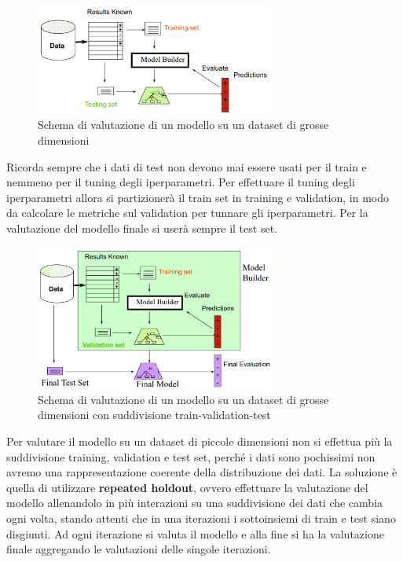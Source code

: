 \begin{figure}[!ht]
    \centering
    \includegraphics[width=0.7\textwidth]{img/performance evaluation/eval-big-dataset.png}
    \caption{Schema di valutazione di un modello su un dataset di grosse dimensioni}
    \label{fig:eval-big-dataset}
\end{figure}

Ricorda sempre che i dati di test non devono mai essere usati per il train e nemmeno
per il tuning degli iperparametri. Per effettuare il tuning degli iperparametri allora
si partizionerà il train set in training e validation, in modo da calcolare le
metriche sul validation per tunnare gli iperparametri. Per la valutazione del modello
finale si userà sempre il test set.

\begin{figure}[!ht]
    \centering
    \includegraphics[width=0.7\textwidth]{img/performance evaluation/eval-big-dataset-train-validation-test.png}
    \caption{Schema di valutazione di un modello su un dataset di grosse dimensioni
        con suddivisione train-validation-test}
    \label{fig:eval-big-dataset-train-validation-test}
\end{figure}

Per valutare il modello su un dataset di piccole dimensioni non si effettua più
la suddivisione training, validation e test set, perché i dati sono pochissimi non
avremo una rappresentazione coerente della distribuzione dei dati. La soluzione è
quella di utilizzare \textbf{repeated holdout}, ovvero effettuare la valutazione
del modello allenandolo in più interazioni su una suddivisione dei dati che cambia
ogni volta, stando attenti che in una iterazioni i sottoinsiemi di train e test siano
disgiunti. Ad ogni iterazione si valuta il modello e alla fine si ha la valutazione
finale aggregando le valutazioni delle singole iterazioni.

